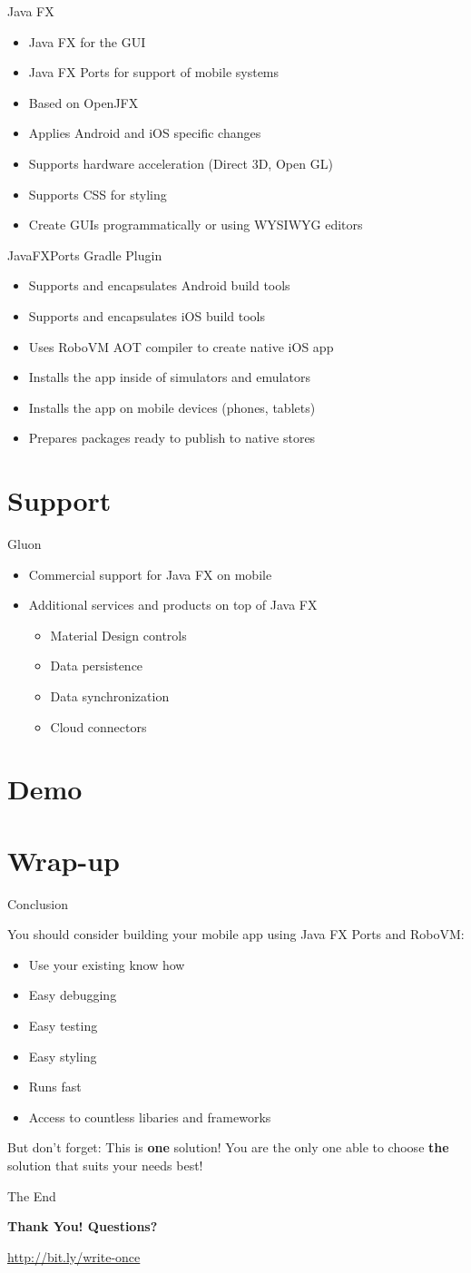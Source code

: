 \documentclass{beamer}
\newcommand{\bb}[1]{\textbf{#1}}
\newcommand{\slideItems}[1]{
	\begin{itemize}
		#1
	\end{itemize}
}
\newcommand{\slide}[2]{
	\begin{frame}{#1}
		#2
	\end{frame}
}
\begin{document}
\slide{Java FX}{
	\slideItems{
		\item Java FX for the GUI
		\item Java FX Ports for support of mobile systems
		\item Based on OpenJFX
		\item Applies Android and iOS specific changes
		\item Supports hardware acceleration (Direct 3D, Open GL)
		\item Supports CSS for styling
		\item Create GUIs programmatically or using WYSIWYG editors
	}
}

\slide{JavaFXPorts Gradle Plugin}{
	\slideItems{
		\item Supports and encapsulates Android build tools
		\item Supports and encapsulates iOS build tools
		\item Uses RoboVM AOT compiler to create native iOS app
		\item Installs the app inside of simulators and emulators
		\item Installs the app on mobile devices (phones, tablets)
		\item Prepares packages ready to publish to native stores
	}
}

\section{Support}

\slide{Gluon}{
	\slideItems{
		\item Commercial support for Java FX on mobile
		\item Additional services and products on top of Java FX
		\slideItems{
			\item Material Design controls
			\item Data persistence
			\item Data synchronization
			\item Cloud connectors
		}
	}
}

\section{Demo}

\section{Wrap-up}

\slide{Conclusion}{
	You should consider building your mobile app using Java FX Ports and RoboVM:
	\slideItems{
		\item Use your existing know how
		\item Easy debugging
		\item Easy testing
		\item Easy styling
		\item Runs fast
		\item Access to countless libaries and frameworks
	}
	But don't forget: This is \bb{one} solution! You are the only one able to choose \bb{the} solution that suits your needs best!
}

\slide{The End}{
	\begin{center}
		\begin{huge}\bb{Thank You! Questions?}\end{huge}
		
		\qrcode[hyperlink,height=5cm]{http://bit.ly/write-once}
		
		\url{http://bit.ly/write-once}
	\end{center}
}
\end{document}
